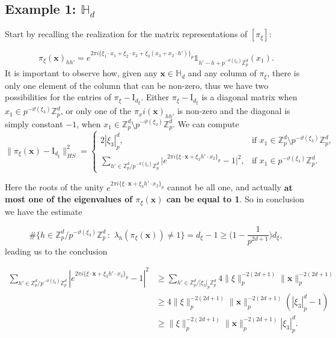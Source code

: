 \documentclass[12pt, reqno]{amsart}
\newcommand{\Z}{\mathbb{Z}}
\newcommand{\1}{\mathds{1}}
\begin{document}
\subsection{Example 1: $\mathbb{H}_d$} Start by recalling the realization for the matrix representations of $[\pi_\xi]$:

\[
\pi_\xi(\mathbf{x})_{hh'} = e^{2\pi i \{ \xi_1 \cdot x_1 + \xi_2 \cdot x_2 + \xi_3(x_3 + x_2 \cdot h') \}_p} \mathbb{1}_{h'-h + p^{-\vartheta(\xi_3)} \mathbb{Z}_p^d}(x_1).
\]
It is important to observe how, given any $\mathbf{x} \in \mathbb{H}_d $ and any column of $\pi_\xi$, there is only one element of the column that can be non-zero, thus we have two possibilities for the entries of $\pi_\xi - \mathrm{I}_{d_\xi}$. Either $\pi_\xi - \mathrm{I}_{d_\xi}$ is a diagonal matrix when $x_1 \in p^{-\vartheta(\xi_3)}\Z_p^d$, or only one of the $\pi_xi(\mathbf{x})_{hh'}$ is non-zero and the diagonal is simply constant $-1$, when $x_1 \in \Z_p^d \setminus p^{-\vartheta(\xi_3)}\Z_p^d$. We can compute
\[
\|\pi_\xi(\mathbf{x}) - \mathrm{I}_{d_\xi}\|^2_{HS} =
\begin{cases}
2|\xi_3|_p^d, & \text{if } x_1 \in \mathbb{Z}^d_p \setminus p^{-\vartheta(\xi_3)}\mathbb{Z}^d_p, \\[6pt]
\displaystyle \sum_{h' \in \mathbb{Z}^d_p / p^{-\vartheta(\xi_3)} \mathbb{Z}^d_p}
\Big| e^{2\pi i \{\xi \cdot \mathbf{x} + \xi_3 h' \cdot x_2\}_p} - 1 \Big|^2, & 
\text{if } x_1 \in p^{-\vartheta(\xi_3)}\mathbb{Z}^d_p.
\end{cases}
\]

Here the roots of the unity $e^{2\pi i \{\xi \cdot \mathbf{x} + \xi_3 h' \cdot x_2\}_p}$ cannot be all one, and actually \textbf{at most one of the eigenvalues of $\pi_\xi (\mathbf{x})$ can be equal to 1}. So in conclusion we have the estimate

$$\# \{ h \in \mathbb{Z}^d_p / p^{-\vartheta(\xi_3)} \mathbb{Z}^d_p \, :  \,\, \lambda_h (\pi_\xi (\mathbf{x})) \neq 1 \}= d_\xi -1 \geq \big( 1 -\frac{1}{p^{2d+1}} \big)  d_\xi, $$
leading us to the conclusion

\begin{align*}
\sum_{ h' \in \mathbb{Z}^d_p / p^{-\vartheta(\xi_3)} \mathbb{Z}^d_p } 
\left| e^{2\pi i \{\xi \cdot \mathbf{x} + \xi_3 h' \cdot x_2\}_p} - 1 \right|^2 
&\geq \sum_{h' \in \mathbb{Z}^d_p / |\xi_3|_p \mathbb{Z}^d_p}
4 \|\xi\|_p^{-2(2d+1)} \|\mathbf{x}\|_p^{-2(2d+1)} \\
&\geq  4 \|\xi\|_p^{-2(2d+1)} \|\mathbf{x}\|_p^{-2(2d+1)} (|\xi_3|_p^d - 1) \\
&\geq \|\xi\|_p^{-2(2d+1)} \|\mathbf{x}\|_p^{-2(2d+1)} |\xi_3|_p^d .
\end{align*}
\end{document}
